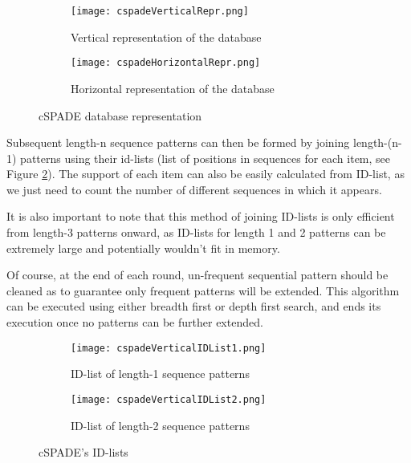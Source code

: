 \documentclass{eplmastersthesis}
\begin{document}
\begin{figure}[h]
  \centering
  \begin{subfigure}[t]{0.4\textwidth}
  	\centering
  	\texttt{[image: cspadeVerticalRepr.png]}
    \caption{Vertical representation of the database}
  \end{subfigure}
  \begin{subfigure}[t]{0.59\textwidth}
  	\centering
    \texttt{[image: cspadeHorizontalRepr.png]}
    \caption{Horizontal representation of the database}
  \end{subfigure}
  \caption{cSPADE database representation}
  \label{ex:cspadeDatabaseRepr}
\end{figure}

Subsequent length-n sequence patterns can then be formed by joining length-(n-1) patterns using their id-lists (list of positions in sequences for each item, see Figure \ref{fig:cspadeIDList}). The support of each item can also be easily calculated from ID-list, as we just need to count the number of different sequences in which it appears.  \newline

It is also important to note that this method of joining ID-lists is only efficient from length-3 patterns onward, as ID-lists for length 1 and 2 patterns can be extremely large and potentially wouldn't fit in memory. \newline

Of course, at the end of each round, un-frequent sequential pattern should be cleaned as to guarantee only frequent patterns will be extended. This algorithm can be executed using either breadth first or depth first search, and ends its execution once no patterns can be further extended.

\begin{figure}[h]
  \centering
  \begin{subfigure}[t]{0.54\textwidth}
  	\centering
  	\texttt{[image: cspadeVerticalIDList1.png]}
    \caption{ID-list of length-1 sequence patterns}
  \end{subfigure}
  \begin{subfigure}[t]{0.45\textwidth}
  	\centering
    \texttt{[image: cspadeVerticalIDList2.png]}
    \caption{ID-list of length-2 sequence patterns}
  \end{subfigure}
  \caption{cSPADE's ID-lists}
  \label{fig:cspadeIDList}
\end{figure}
\end{document}

